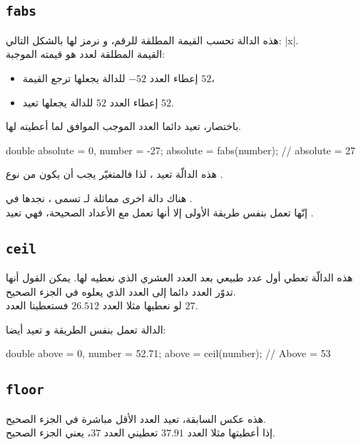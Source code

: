 \subsection{\texttt{fabs}}

هذه الدالة تحسب القيمة المطلقة للرقم، و نرمز لها بالشكل التالي:
\textenglish{|x|}.\\
القيمة المطلقة لعدد هو قيمته الموجبة:

\begin{itemize}
  \item إعطاء العدد $ -52 $ للدالة يجعلها ترجع القيمة $ 52 $،
  \item إعطاء العدد $ 52 $ للدالة يجعلها تعيد $ 52 $.
\end{itemize}

باختصار، تعيد دائما العدد الموجب الموافق لما أعطيته لها.

\begin{Console}
double absolute = 0, number = -27;
absolute = fabs(number); // absolute = 27
\end{Console}

هذه الدالّة تعيد
،
لذا فالمتغيّر
يجب أن يكون من نوع
.

\begin{information}
هناك دالة اخرى مماثلة لـ
تسمى
،
نجدها في
.\\
إنّها تعمل بنفس طريقة الأولى إلا أنها تعمل مع الأعداد الصحيحة، فهي تعيد
.
\end{information}

\subsection{\texttt{ceil}}

هذه الدالّة تعطي أول عدد طبيعي بعد العدد العشري الذي نعطيه لها. يمكن القول أنها تدوّر العدد دائما إلى العدد الذي يعلوه في الجزء الصحيح.\\
لو نعطيها مثلا العدد $ 26.512 $ فستعطينا العدد $ 27 $.

الدالة تعمل بنفس الطريقة و تعيد
أيضا:

\begin{Csource}
double above = 0, number = 52.71;
above = ceil(number); // Above = 53
\end{Csource}

\subsection{\texttt{floor}}
هذه عكس السابقة، تعيد العدد الأقل مباشرة في الجزء الصحيح.\\
إذا أعطيتها مثلا العدد $ 37.91 $ تعطيني العدد $ 37 $، يعني الجزء الصحيح.

